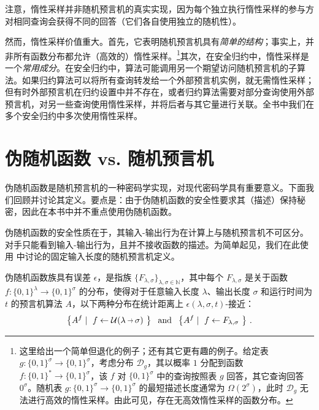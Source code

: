 \documentclass[american,singlepageview]{snargs-book-zh}
\renewcommand{\enspace}{\ensuremath{\thinspace}}
\newcommand{\Bits}{\{0,1\}}
\newcommand{\TextAndInMath}{\;\text{ and }\;}
\newcommand{\GivenExperiment}{\;\vert\;}
\newcommand{\StateExperiment}[1]{
\!\begin{array}{l}
#1
\end{array}\!}
\newcommand{\Distribution}{\mathcal{D}}
\newcommand{\Naturals}{\mathbb{N}}
\newcommand{\ROFunction}{f}
\newcommand{\ROIODistribution}[2]{\mathcal{U}(#1 \scalebox{0.65}[1]{ $\to$ } #2)}
\newcommand{\ROInputSize}{\lambda}
\newcommand{\ROOutputSize}{\sigma}
\begin{document}
注意，惰性采样并非随机预言机的真实实现，因为每个独立执行惰性采样的参与方对相同查询会获得不同的回答（它们各自使用独立的随机性）。

然而，惰性采样价值重大。首先，它表明随机预言机具有\emph{简单的结构}；事实上，并非所有函数分布都允许（高效的）惰性采样。\footnote{这里给出一个简单但退化的例子；还有其它更有趣的例子。给定表 $g \colon \Bits^{\ROOutputSize} \to \Bits^{\ROOutputSize}$，考虑分布 $\Distribution_{g}$，其以概率 $1$ 分配到函数 $\ROFunction \colon \Bits^{*} \to \Bits^{\ROOutputSize}$，该 $\ROFunction$ 对 $\Bits^{\ROOutputSize}$ 中的查询按照表 $g$ 回答，其它查询回答 $0^{\ROOutputSize}$。随机表 $g \colon \Bits^{\ROOutputSize} \to \Bits^{\ROOutputSize}$ 的最短描述长度通常为 $\Omega(2^{\ROOutputSize})$，此时 $\Distribution_{g}$ 无法进行高效的惰性采样。由此可见，存在无高效惰性采样的函数分布。}其次，在安全归约中，惰性采样是一个\emph{常用成分}。在安全归约中，算法可能调用另一个期望访问随机预言机的子算法。如果归约算法可以将所有查询转发给一个外部预言机实例，就无需惰性采样；但有时外部预言机在归约设置中并不存在，或者归约算法需要对部分查询使用外部预言机，对另一些查询使用惰性采样，并将后者与其它量进行关联。全书中我们在多个安全归约中多次使用惰性采样。

\section{伪随机函数 vs. 随机预言机}
\label{section:prf-vs-ro}

伪随机函数是随机预言机的一种密码学实现，对现代密码学具有重要意义。下面我们回顾并讨论其定义。要点是：由于伪随机函数的安全性要求其（描述）保持秘密，因此在本书中并不重点使用伪随机函数。

伪随机函数的安全性质在于，其输入-输出行为在计算上与随机预言机不可区分。对手只能看到输入-输出行为，且并不接收函数的描述。为简单起见，我们在此使用 中讨论的固定输入长度的随机预言机定义。

\begin{definition}
\label{definition:prf}
伪随机函数族具有误差 $\epsilon$，是指族 $\{F_{\ROInputSize,\ROOutputSize}\}_{\ROInputSize,\ROOutputSize \in \Naturals}$，其中每个 $F_{\ROInputSize,\ROOutputSize}$ 是关于函数 $\ROFunction \colon \Bits^{\ROInputSize} \to \Bits^{\ROOutputSize}$ 的分布，使得对于任意输入长度 $\ROInputSize$、输出长度 $\ROOutputSize$ 和运行时间为 $t$ 的预言机算法 $A$，以下两种分布在统计距离上 $\epsilon(\ROInputSize,\ROOutputSize,t)$-接近：
\begin{equation*}
\left\{
A^{\ROFunction}\GivenExperiment
\StateExperiment{\ROFunction \gets \ROIODistribution{\ROInputSize}{\ROOutputSize}}
\right\}
\TextAndInMath
\left\{
A^{f}\GivenExperiment
\StateExperiment{f \gets F_{\ROInputSize,\ROOutputSize}}
\right\}
\enspace.
\end{equation*}
\end{definition}
\end{document}
